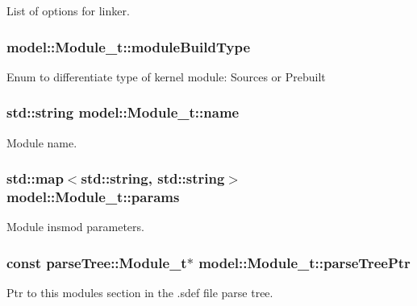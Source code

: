 List of options for linker. 

\subsubsection[{\texorpdfstring{module\+Build\+Type}{moduleBuildType}}]{ model\+::\+Module\+\_\+t\+::module\+Build\+Type}\hypertarget{structmodel_1_1_module__t_af9cddd8f1cfa93a05dfdd377396dc10d}{}\label{structmodel_1_1_module__t_af9cddd8f1cfa93a05dfdd377396dc10d}
Enum to differentiate type of kernel module\+: Sources or Prebuilt 
\subsubsection[{\texorpdfstring{name}{name}}]{\setlength{\rightskip}{0pt plus 5cm}std\+::string model\+::\+Module\+\_\+t\+::name}\hypertarget{structmodel_1_1_module__t_a74b8836c5f3fddefb1503c68b270595f}{}\label{structmodel_1_1_module__t_a74b8836c5f3fddefb1503c68b270595f}


Module name. 

\subsubsection[{\texorpdfstring{params}{params}}]{\setlength{\rightskip}{0pt plus 5cm}std\+::map$<$std\+::string, std\+::string$>$ model\+::\+Module\+\_\+t\+::params}\hypertarget{structmodel_1_1_module__t_a0a6380318c1b48336dc9348640deac71}{}\label{structmodel_1_1_module__t_a0a6380318c1b48336dc9348640deac71}


Module insmod parameters. 

\subsubsection[{\texorpdfstring{parse\+Tree\+Ptr}{parseTreePtr}}]{\setlength{\rightskip}{0pt plus 5cm}const {\bf parse\+Tree\+::\+Module\+\_\+t}$\ast$ model\+::\+Module\+\_\+t\+::parse\+Tree\+Ptr}\hypertarget{structmodel_1_1_module__t_a578f87243f639d9f70f2babb53ff0c2e}{}\label{structmodel_1_1_module__t_a578f87243f639d9f70f2babb53ff0c2e}
Ptr to this module\textquotesingle{}s section in the .sdef file parse tree. 
